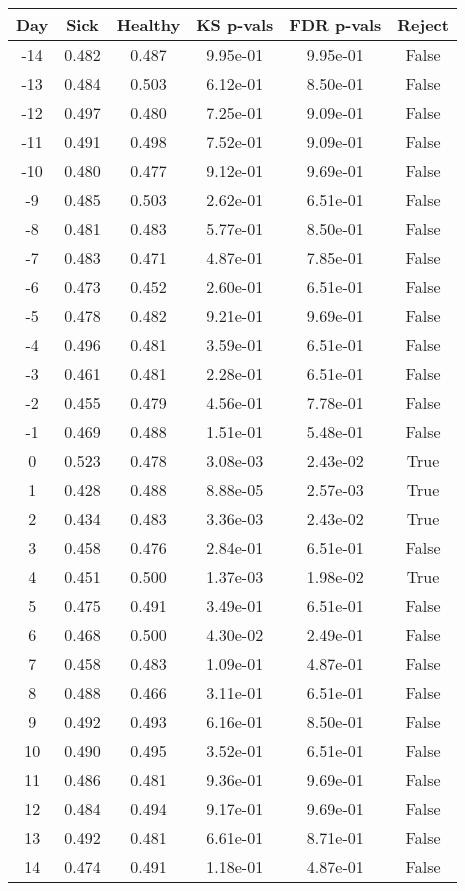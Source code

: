 \begin{tabular}{c|c|c|c|c|c}
Day &  Sick & Healthy &  KS p-vals & FDR p-vals & Reject\\
\hline
-14 & 0.482 &   0.487 &   9.95e-01 &   9.95e-01 &  False\\
-13 & 0.484 &   0.503 &   6.12e-01 &   8.50e-01 &  False\\
-12 & 0.497 &   0.480 &   7.25e-01 &   9.09e-01 &  False\\
-11 & 0.491 &   0.498 &   7.52e-01 &   9.09e-01 &  False\\
-10 & 0.480 &   0.477 &   9.12e-01 &   9.69e-01 &  False\\
 -9 & 0.485 &   0.503 &   2.62e-01 &   6.51e-01 &  False\\
 -8 & 0.481 &   0.483 &   5.77e-01 &   8.50e-01 &  False\\
 -7 & 0.483 &   0.471 &   4.87e-01 &   7.85e-01 &  False\\
 -6 & 0.473 &   0.452 &   2.60e-01 &   6.51e-01 &  False\\
 -5 & 0.478 &   0.482 &   9.21e-01 &   9.69e-01 &  False\\
 -4 & 0.496 &   0.481 &   3.59e-01 &   6.51e-01 &  False\\
 -3 & 0.461 &   0.481 &   2.28e-01 &   6.51e-01 &  False\\
 -2 & 0.455 &   0.479 &   4.56e-01 &   7.78e-01 &  False\\
 -1 & 0.469 &   0.488 &   1.51e-01 &   5.48e-01 &  False\\
  0 & 0.523 &   0.478 &   3.08e-03 &   2.43e-02 &   True\\
  1 & 0.428 &   0.488 &   8.88e-05 &   2.57e-03 &   True\\
  2 & 0.434 &   0.483 &   3.36e-03 &   2.43e-02 &   True\\
  3 & 0.458 &   0.476 &   2.84e-01 &   6.51e-01 &  False\\
  4 & 0.451 &   0.500 &   1.37e-03 &   1.98e-02 &   True\\
  5 & 0.475 &   0.491 &   3.49e-01 &   6.51e-01 &  False\\
  6 & 0.468 &   0.500 &   4.30e-02 &   2.49e-01 &  False\\
  7 & 0.458 &   0.483 &   1.09e-01 &   4.87e-01 &  False\\
  8 & 0.488 &   0.466 &   3.11e-01 &   6.51e-01 &  False\\
  9 & 0.492 &   0.493 &   6.16e-01 &   8.50e-01 &  False\\
 10 & 0.490 &   0.495 &   3.52e-01 &   6.51e-01 &  False\\
 11 & 0.486 &   0.481 &   9.36e-01 &   9.69e-01 &  False\\
 12 & 0.484 &   0.494 &   9.17e-01 &   9.69e-01 &  False\\
 13 & 0.492 &   0.481 &   6.61e-01 &   8.71e-01 &  False\\
 14 & 0.474 &   0.491 &   1.18e-01 &   4.87e-01 &  False\\
\end{tabular}